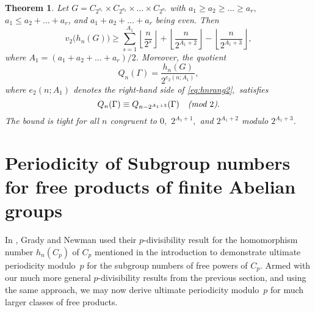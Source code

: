 \documentclass[12pt,reqno]{amsart}
\numberwithin{equation}{section}
\newtheorem{theorem}{Theorem}
\theoremstyle{remark}
\begin{document}
\begin{theorem} \label{thm:rang2}
Let\/ $G=C_{2^{a_1}}\times C_{2^{a_2}}\times\dots \times
C_{2^{a_r}}$ with $a_1\ge a_2\ge \dots \ge a_r,$
$a_1\le a_2+\dots+a_r$, and $a_1+a_2+\dots+a_r$ being even.
Then
\begin{equation} \label{eq:hnrang2} 
v_2\big(h_n(G)\big)\ge \sum_{s=1}^{A_1}{\left\lfloor{\frac {n} {2^s}}\right\rfloor}
+{\left\lfloor{\frac {n} {2^{A_1+2}}}\right\rfloor}
-{\left\lfloor{\frac {n} {2^{A_1+3}}}\right\rfloor},
\end{equation}
where $A_1=(a_1+a_2+\dots+a_r)/2$.
Moreover, the quotient
\begin{equation*} 
Q_n({\Gamma})=\frac {h_n(G)} 
{2^{e_2(n;A_1)}},
\end{equation*}
where $e_2(n;A_1)$ denotes the right-hand side of \eqref{eq:hnrang2}$,$
satisfies
\begin{equation} \label{eq:Qrek2} 
Q_n({\Gamma})\equiv Q_{n-2^{A_1+3}}({\Gamma}) 
\quad \text{\em (mod $2$)}.
\end{equation}
The bound is tight for all $n$ congruent to 
$0,$ $2^{A_1+1},$ and $2^{A_1+2}$ modulo $2^{A_1+3}$.
\end{theorem}

\section{Periodicity of 
Subgroup numbers for free products of finite Abelian groups}
\label{sec:per}

In \cite{GrNeAA}, Grady and Newman used their $p$-divisibility
result for the homomorphism number $h_n(C_p)$ of $C_p$ mentioned in the
introduction to demonstrate ultimate periodicity modulo~$p$ for the subgroup
numbers of free powers of $C_p$. Armed with our much more general
$p$-divisibility results from the previous section, and using
the same approach, we may now derive ultimate periodicity modulo~$p$ 
for much larger classes of free products.
\end{document}

